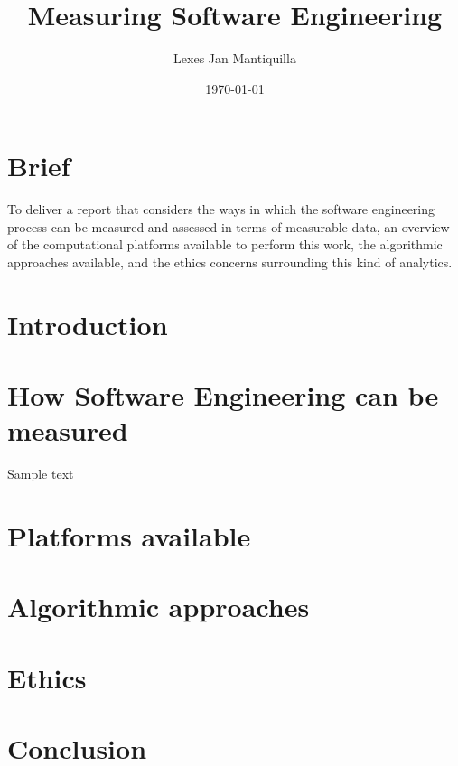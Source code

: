 \documentclass{article}
\title{Measuring Software Engineering}
\author{Lexes Jan Mantiquilla}
\date{\today}
\begin{document}
\maketitle
\tableofcontents
\newpage

\section{Brief}
To deliver a report that considers the ways in which the software engineering
process can be measured and assessed in terms of measurable data, an overview
of the computational platforms available to perform this work, the algorithmic
approaches available, and the ethics concerns surrounding this kind of
analytics.

\section{Introduction}
\section{How Software Engineering can be measured}
Sample text~\cite{fenton1999software}
\section{Platforms available}
\section{Algorithmic approaches}
\section{Ethics}
\section{Conclusion}



\end{document}
